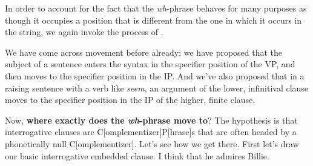 \documentclass{article}
\begin{document}
In order to account for the fact that the \emph{wh}-phrase behaves for many purposes as though it occupies a position that is different from the one in which it occurs in the string, we again invoke the process of .
\begin{exe}
\end{exe}
We have come across movement before already: we have proposed that the subject of a sentence enters the syntax in the specifier position of the VP, and then moves to the specifier position in the IP.
And we've also proposed that in a raising sentence with a verb like \emph{seem}, an argument of the lower, infinitival clause moves to the specifier position in the IP of the higher, finite clause.

Now, \textbf{where exactly does the \emph{wh}-phrase move to}?
The hypothesis is that interrogative clauses are C[omplementizer]P[hrase]s that are often headed by a phonetically null C[omplementizer]. Let's see how we get there. First let's draw our basic interrogative embedded clause.
\ea
    \ea I think that he admires Billie. \label{admire_charles_A}
    \label{admire_charles_B}
    \z
\z
\end{document}
